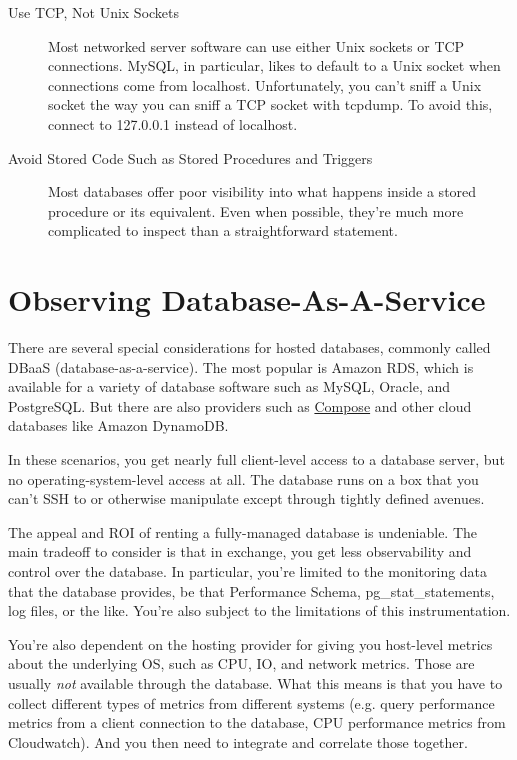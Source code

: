 \documentclass{vivid_layout}
\begin{document}
\begin{description}
\item[Use TCP, Not Unix Sockets] Most networked server software can use either
Unix sockets or TCP connections. MySQL, in particular, likes to default to a
Unix socket when connections come from localhost. Unfortunately, you can't sniff
a Unix socket the way you can sniff a TCP socket with tcpdump. To avoid this,
connect to 127.0.0.1 instead of localhost.

\item[Avoid Stored Code Such as Stored Procedures and Triggers] Most databases
offer poor visibility into what happens inside a stored procedure or its
equivalent. Even when possible, they're much more complicated to inspect 
than a straightforward statement.

\end{description}

\section{Observing Database-As-A-Service}

There are several special considerations for hosted databases, commonly called
DBaaS (database-as-a-service). The most popular is Amazon
RDS, which is available for a variety of database software such as MySQL,
Oracle, and PostgreSQL. But there are also providers such as
\href{http://compose.io}{Compose} and other cloud databases like Amazon
DynamoDB. 

In these scenarios, you get nearly full client-level access to a
database server, but no operating-system-level access at all. The database runs
on a box that you can't SSH to or otherwise manipulate except through tightly
defined avenues.

The appeal and ROI of renting a fully-managed database is undeniable.
The main tradeoff to consider is that in exchange, you get less observability and control
over the database. In particular, you're limited to the monitoring data that the
database provides, be that Performance Schema, pg\_stat\_statements, log files,
or the like.  You're also subject to the limitations of this
instrumentation.

You're also dependent on the hosting provider for giving you host-level metrics
about the underlying OS, such as CPU, IO, and network metrics. Those are
usually \emph{not} available through the database. What this means is that you
have to collect different types of metrics from different systems (e.g. query
performance metrics from a client connection to the database, CPU performance
metrics from Cloudwatch). And you then need to integrate and correlate those
together.
\end{document}
